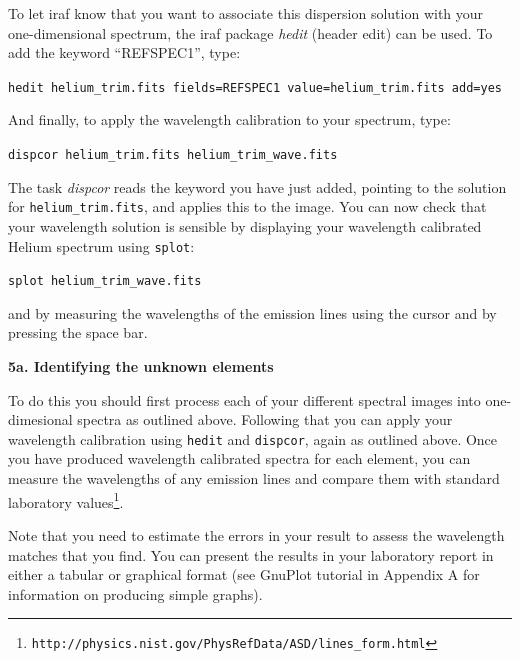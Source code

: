 \documentclass[12pt]{article}
\begin{document}
To let {\sc iraf} know that you want to associate this dispersion
solution with your one-dimensional spectrum, the {\sc iraf} package {\it hedit} (header edit) can be used. To add
the keyword ``REFSPEC1'', type:

{\tt hedit helium\verb,_trim.fits, fields=REFSPEC1 value=helium\verb,_trim.fits, add=yes}

And finally, to apply the wavelength calibration to your spectrum, type:

{\tt dispcor helium\verb,_trim.fits helium_trim_wave.fits,}

The task {\it dispcor} reads the keyword you have just added, pointing to the solution for {\tt \verb,helium_trim.fits,}, and applies this to the image.
You can now check that your wavelength solution is sensible by
displaying your wavelength calibrated Helium spectrum using {\tt splot}:

{\tt splot \verb,helium_trim_wave.fits,}

and by measuring the wavelengths of the emission lines using the
cursor and by pressing the space bar.

{\bf 5a. Identifying the unknown elements}

\noindent
To do this you should first process each of your different spectral images into
one-dimesional spectra as outlined above. Following that you can apply
your wavelength calibration using {\tt hedit} and {\tt dispcor}, again
as outlined above. Once you have produced wavelength calibrated
spectra for each element, you can measure the wavelengths of any
emission lines and compare them with standard laboratory values\footnote{
{\tt http://physics.nist.gov/PhysRefData/ASD/lines\_form.html}}. 

Note that you need to estimate the errors in your result to assess the wavelength matches
that you find. You can present the results in your laboratory report
in either a tabular or graphical format (see GnuPlot tutorial in
Appendix A for information on producing simple graphs).
\end{document}
